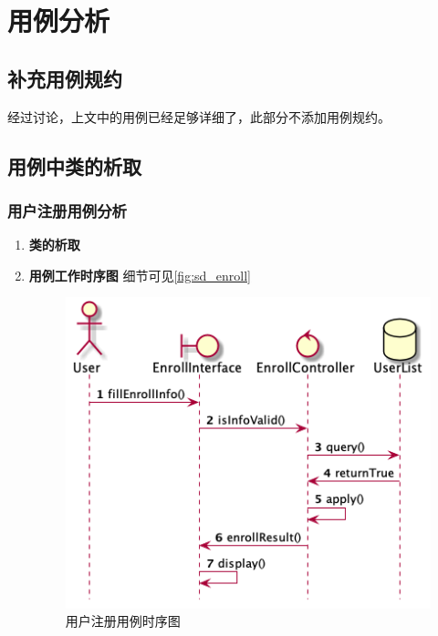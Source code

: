 \chapter{用例分析}
	
\section{补充用例规约}
	经过讨论，上文中的用例已经足够详细了，此部分不添加用例规约。
\section{用例中类的析取}
	\subsection{用户注册用例分析} %
	\label{sub:用户注册用例分析}
	\begin{enumerate}
		\item \textbf{类的析取}

		\item \textbf{用例工作时序图}
		细节可见\autoref{fig:sd_enroll}

		\begin{figure}[htp]
		    \centering
		    \includegraphics[width=12cm]{figure/sequenceDiagram/sd_enroll.png}
		    \caption{用户注册用例时序图}
		    \label{fig:sd_enroll}
		\end{figure}

	\end{enumerate}

